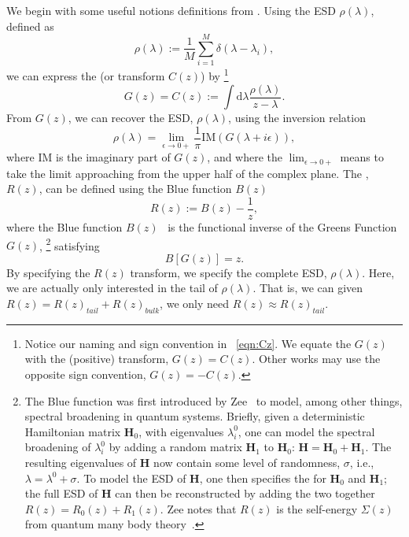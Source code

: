We begin with some useful notions definitions from \RandomMatrixTheory.
%
Using the ESD $\rho(\lambda)$, defined as
\begin{equation}
\label{eqn:rgo}
\rho(\lambda):=\frac{1}{M}\sum_{i=1}^{M}\delta(\lambda-\lambda_{i})  ,
\end{equation}
%
we can express the \emph{\GreensFunction} (or \emph{\CauchyStieltjes} transform $C(z)$) by%
\footnote{Notice our naming and sign convention in \EQN~\ref{eqn:Cz}.
We equate the \GreensFunction $G(z)$ with
the (positive) \CauchyStieltjes transform, $G(z)=C(z)$.   Other works may use the opposite sign convention, $G(z)=-C(z)$.}
\begin{equation}
\label{eqn:Cz}
G(z)=C(z):=\int \mathrm{d}\lambda \frac{\rho(\lambda)}{z-\lambda} .
\end{equation}
%
From $G(z)$, we can recover the ESD, $\rho(\lambda)$, using the inversion relation
\begin{equation}
\label{eqn:GzInverse}
\rho(\lambda)=\lim_{\epsilon\rightarrow 0+}\frac{1}{\pi}\mathrm{IM}(G(\lambda+i\epsilon))  ,
\end{equation}
where $\mathrm{IM}$ is the imaginary part of $G(z)$, and where the $\lim_{\epsilon\rightarrow 0+}$ means to take the limit approaching from the upper half of the complex plane.
%
The \RTransform, $R(z)$, can be defined using the Blue function $B(z)$ 
\begin{equation}
\label{eqn:Rz}
R(z):=B(z)-\frac{1}{z}  ,
\end{equation}
where the Blue function $B(z)$~\cite{Zee1996} is the functional inverse of the Greens Function $G(z)$,%
\footnote{The Blue function was first introduced by Zee~\cite{Zee1996} to model, among other things, spectral broadening in quantum systems.
Briefly, given a deterministic Hamiltonian matrix $\mathbf{H}_{0}$, with eigenvalues $\lambda^{0}_{i}$,
one can model the spectral broadening of $\lambda^{0}_{i}$ by adding a random matrix $\mathbf{H}_{1}$ to $\mathbf{H}_{0}$:
$\mathbf{H}=\mathbf{H}_{0}+\mathbf{H}_{1}$.  
The resulting eigenvalues of $\mathbf{H}$ now contain some level of randomness, $\sigma$, i.e., $\lambda=\lambda^{0}+\sigma$.  
To model the ESD of $\mathbf{H}$, one then specifies the \RTransforms for $\mathbf{H}_{0}$ and $\mathbf{H}_{1}$; the full ESD of $\mathbf{H}$
can then be reconstructed by adding the two \RTransforms together $R(z)=R_{0}(z)+R_{1}(z)$.
Zee notes that $R(z)$  is  the self-energy $\Sigma(z)$ from quantum many body theory~\cite{Zee1996}.}
satisfying 
\begin{equation}
\label{eqn:GzRelation}
B[G(z)]=z  .
\end{equation}
By specifying the $R(z)$ transform, we specify the complete ESD, $\rho(\lambda)$.
Here, we are actually only interested in the tail of $\rho(\lambda)$.
That is, we can given $R(z)=R(z)_{tail}+R(z)_{bulk}$, we only need $R(z)\approx R(z)_{tail}$.

